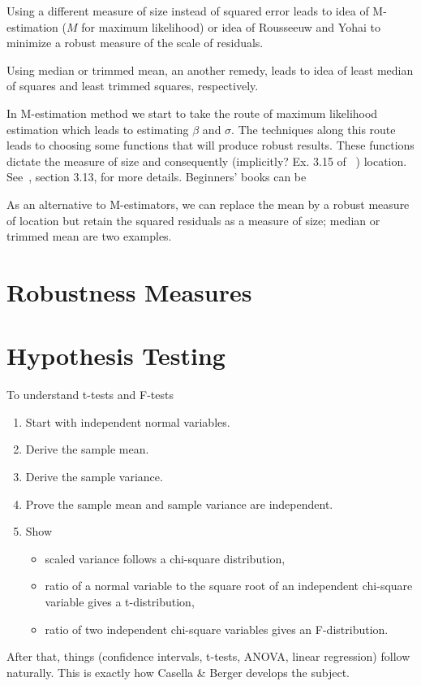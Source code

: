 Using a different measure of size instead of squared error
leads to idea of M-estimation ($M$ for maximum likelihood) 
or idea of Rousseeuw and Yohai to minimize
a robust measure of the scale of residuals.

Using median or trimmed mean, an another remedy, 
leads to idea of least median of squares
and least trimmed squares, respectively.

In M-estimation method we start to take the route of 
maximum likelihood estimation which leads to estimating 
$\beta$ and $\sigma$. The techniques along this route leads
to choosing some functions that will produce robust results.
These functions dictate the measure of size and consequently 
(implicitly? Ex. 3.15 of ~\citep{seber2012linear}) location.
See~\citep{seber2012linear}, section 3.13, for more details.
Beginners' books can be~\cite{frost2020hypothesis}

As an alternative to M-estimators, we can replace 
the mean by a robust measure of location but retain 
the squared residuals as a measure of size; median or 
trimmed mean are two examples.

\section{Robustness Measures}
\label{sec:Robustness-Measures}

\section{Hypothesis Testing}
\label{sec:Hypothesis-Testing}

\begin{tcolorbox}[colback=aliceblue!10!white,colframe=blue!70!black,title=\textbf{Remark}]
To understand t-tests and F-tests
\begin{enumerate}
\setlength{\itemsep}{-2pt}
\item Start with independent normal variables.
\item Derive the sample mean.
\item Derive the sample variance.
\item Prove the sample mean and sample variance are independent.
\item Show
\begin{itemize}
\setlength{\itemsep}{-2pt}
\item scaled variance follows a chi-square distribution,
\item ratio of a normal variable to the square root of an independent chi-square variable gives a t-distribution,
\item ratio of two independent chi-square variables gives an F-distribution.
\end{itemize}
\end{enumerate}
After that, things (confidence intervals, t-tests, ANOVA, linear regression) follow naturally.
This is exactly how Casella \& Berger develops the subject.
\end{tcolorbox}

